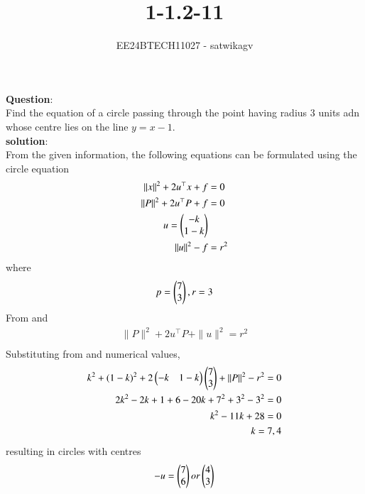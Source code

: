 \documentclass[journal]{IEEEtran}
\begin{document}

\vspace{3cm}

\title{1-1.2-11}
\author{EE24BTECH11027 - satwikagv}
{\let\newpage\relax\maketitle}

\renewcommand{\thefigure}{\theenumi}
\renewcommand{\thetable}{\theenumi}
\setlength{\intextsep}{10pt} %


\renewcommand{\thetable}{\theenumi}
\textbf{Question}:\\
Find the equation of a circle passing through the point  having radius 3 units adn whose centre lies on the line $y=x-1$.\\
\textbf{solution}:\\From the given information, the following equations can be formulated using the circle equation 
\begin{align}
\|x\|^2 + 2u^\top x + f &= 0\\
\|P\|^2 + 2u^\top P + f &= 0\\
u=\begin{pmatrix}-k\\1-k\end{pmatrix}\\
\|u\|^2 - f &= r^2\\
\end{align}
where\\
\begin{align}
p=\begin{pmatrix}7\\3\end{pmatrix},r=3\\
\end{align}
From  and 
\begin{align}
\|P\|^2 + 2u^\top P + \|u\|^2 = r^2\\ 	
\end{align}
Substituting from  and numerical values,
\begin{align}
k^2+(1-k)^2+2\begin{pmatrix}-k&1-k\end{pmatrix}\begin{pmatrix}7\\3\end{pmatrix}+\|P\|^2-r^2 = 0\\
2k^2-2k+1+6-20k+7^2+3^2-3^2=0\\
k^2-11k+28=0\\
k=7,4\\
\end{align}
resulting in circles with centres 
\begin{align}
-u=\begin{pmatrix}7\\6\end{pmatrix} or \begin{pmatrix}4\\3\end{pmatrix}\\	
\end{align}
\end{document}
